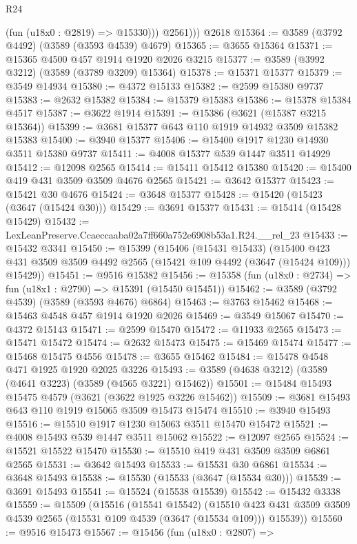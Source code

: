 \begin{lexlean}{R24}
\begin{coremodule}
            (fun (u18x0 : @2819) => @15330)))
          @2561)))
    @2618
@15364 := @3589 (@3792 @4492) (@3589 (@3593 @4539) @4679)
@15365 := @3655 @15364
@15371 := @15365 @4500 @457 @1914 @1920 @2026 @3215
@15377 := @3589 (@3992 @3212) (@3589 (@3789 @3209) @15364)
@15378 := @15371 @15377
@15379 := @3549 @14934
@15380 := @4372 @15133
@15382 := @2599 @15380 @9737
@15383 := @2632 @15382
@15384 := @15379 @15383
@15386 := @15378 @15384 @4517
@15387 := @3622 @1914
@15391 := @15386 (@3621 (@15387 @3215 @15364))
@15399 := @3681 @15377 @643 @110 @1919 @14932 @3509 @15382 @15383
@15400 := @3940 @15377
@15406 := @15400 @1917 @1230 @14930 @3511 @15380 @9737
@15411 := @4008 @15377 @539 @1447 @3511 @14929
@15412 := @12098 @2565
@15414 := @15411 @15412 @15380
@15420 := @15400 @419 @431 @3509 @3509 @4676 @2565
@15421 := @3642 @15377
@15423 := @15421 @30 @4676
@15424 := @3648 @15377
@15428 := @15420 (@15423 (@3647 (@15424 @30)))
@15429 := @3691 @15377
@15431 := @15414 (@15428 @15429)
@15432 := LexLeanPreserve.Ccaeccaaba02a7ff660a752e6908b53a1.R24.__rel_23
@15433 := @15432 @3341
@15450 := @15399
    (@15406
      (@15431 @15433)
      (@15400 @423 @431 @3509 @3509 @4492 @2565 (@15421 @109 @4492 (@3647 (@15424 @109))) @15429))
@15451 := @9516 @15382
@15456 := @15358 (fun (u18x0 : @2734) => fun (u18x1 : @2790) => @15391 (@15450 @15451))
@15462 := @3589 (@3792 @4539) (@3589 (@3593 @4676) @6864)
@15463 := @3763 @15462
@15468 := @15463 @4548 @457 @1914 @1920 @2026
@15469 := @3549 @15067
@15470 := @4372 @15143
@15471 := @2599 @15470
@15472 := @11933 @2565
@15473 := @15471 @15472
@15474 := @2632 @15473
@15475 := @15469 @15474
@15477 := @15468 @15475 @4556
@15478 := @3655 @15462
@15484 := @15478 @4548 @471 @1925 @1920 @2025 @3226
@15493 := @3589 (@4638 @3212) (@3589 (@4641 @3223) (@3589 (@4565 @3221) @15462))
@15501 := @15484 @15493 @15475 @4579 (@3621 (@3622 @1925 @3226 @15462))
@15509 := @3681 @15493 @643 @110 @1919 @15065 @3509 @15473 @15474
@15510 := @3940 @15493
@15516 := @15510 @1917 @1230 @15063 @3511 @15470 @15472
@15521 := @4008 @15493 @539 @1447 @3511 @15062
@15522 := @12097 @2565
@15524 := @15521 @15522 @15470
@15530 := @15510 @419 @431 @3509 @3509 @6861 @2565
@15531 := @3642 @15493
@15533 := @15531 @30 @6861
@15534 := @3648 @15493
@15538 := @15530 (@15533 (@3647 (@15534 @30)))
@15539 := @3691 @15493
@15541 := @15524 (@15538 @15539)
@15542 := @15432 @3338
@15559 := @15509
    (@15516
      (@15541 @15542)
      (@15510 @423 @431 @3509 @3509 @4539 @2565 (@15531 @109 @4539 (@3647 (@15534 @109))) @15539))
@15560 := @9516 @15473
@15567 := @15456
    (fun (u18x0 : @2807) =>

\end{coremodule}
\end{lexlean}
